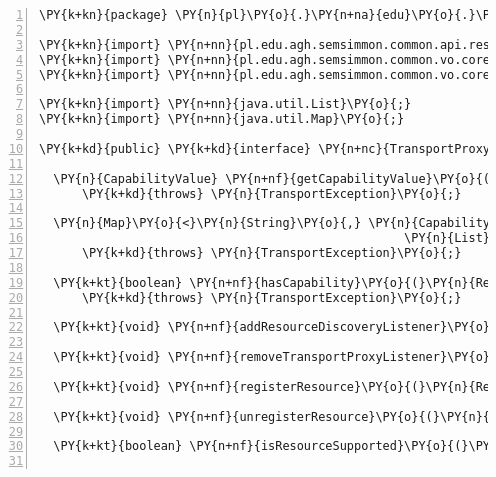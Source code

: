 \begin{Verbatim}[commandchars=\\\{\},numbers=left,firstnumber=1,stepnumber=1]
\PY{k+kn}{package} \PY{n}{pl}\PY{o}{.}\PY{n+na}{edu}\PY{o}{.}\PY{n+na}{agh}\PY{o}{.}\PY{n+na}{semsimmon}\PY{o}{.}\PY{n+na}{common}\PY{o}{.}\PY{n+na}{api}\PY{o}{.}\PY{n+na}{transport}\PY{o}{;}

\PY{k+kn}{import} \PY{n+nn}{pl.edu.agh.semsimmon.common.api.resource.IResourceDiscoveryListener}\PY{o}{;}
\PY{k+kn}{import} \PY{n+nn}{pl.edu.agh.semsimmon.common.vo.core.measurement.CapabilityValue}\PY{o}{;}
\PY{k+kn}{import} \PY{n+nn}{pl.edu.agh.semsimmon.common.vo.core.resource.Resource}\PY{o}{;}

\PY{k+kn}{import} \PY{n+nn}{java.util.List}\PY{o}{;}
\PY{k+kn}{import} \PY{n+nn}{java.util.Map}\PY{o}{;}

\PY{k+kd}{public} \PY{k+kd}{interface} \PY{n+nc}{TransportProxy} \PY{o}{\PYZob{}}

  \PY{n}{CapabilityValue} \PY{n+nf}{getCapabilityValue}\PY{o}{(}\PY{n}{Resource} \PY{n}{resource}\PY{o}{,} \PY{n}{String} \PY{n}{capabilityType}\PY{o}{)}
      \PY{k+kd}{throws} \PY{n}{TransportException}\PY{o}{;}

  \PY{n}{Map}\PY{o}{<}\PY{n}{String}\PY{o}{,} \PY{n}{CapabilityValue}\PY{o}{>} \PY{n}{getCapabilityValues}\PY{o}{(}\PY{n}{Resource} \PY{n}{resource}\PY{o}{,} 
												   \PY{n}{List}\PY{o}{<}\PY{n}{String}\PY{o}{>} \PY{n}{capabilityUris}\PY{o}{)}
      \PY{k+kd}{throws} \PY{n}{TransportException}\PY{o}{;}

  \PY{k+kt}{boolean} \PY{n+nf}{hasCapability}\PY{o}{(}\PY{n}{Resource} \PY{n}{resource}\PY{o}{,} \PY{n}{String} \PY{n}{capabilityType}\PY{o}{)}
      \PY{k+kd}{throws} \PY{n}{TransportException}\PY{o}{;}

  \PY{k+kt}{void} \PY{n+nf}{addResourceDiscoveryListener}\PY{o}{(}\PY{n}{IResourceDiscoveryListener} \PY{n}{listener}\PY{o}{)}\PY{o}{;}

  \PY{k+kt}{void} \PY{n+nf}{removeTransportProxyListener}\PY{o}{(}\PY{n}{IResourceDiscoveryListener} \PY{n}{listener}\PY{o}{)}\PY{o}{;}

  \PY{k+kt}{void} \PY{n+nf}{registerResource}\PY{o}{(}\PY{n}{Resource} \PY{n}{resource}\PY{o}{)} \PY{k+kd}{throws} \PY{n}{TransportException}\PY{o}{;}

  \PY{k+kt}{void} \PY{n+nf}{unregisterResource}\PY{o}{(}\PY{n}{Resource} \PY{n}{resource}\PY{o}{)} \PY{k+kd}{throws} \PY{n}{TransportException}\PY{o}{;}

  \PY{k+kt}{boolean} \PY{n+nf}{isResourceSupported}\PY{o}{(}\PY{n}{Resource} \PY{n}{resource}\PY{o}{)}\PY{o}{;}


\end{Verbatim}

